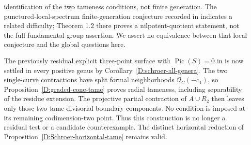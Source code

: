 \begin{remark}
identification of the two tameness conditions, not finite generation.
The punctured-local-spectrum finite-generation conjecture recorded in
\cite[Conjecture 1.1]{Suzuki2023} indicates a related difficulty;
Theorem 1.2 there proves a nilpotent-quotient statement, not the full
fundamental-group assertion. We assert no equivalence between that
local conjecture and the global questions here.
\par
The previously residual explicit three-point surface with
$\operatorname{Pic}(S)=0$ in
\cite[sections 3.1--3.2, author's PDF p.~5]{Schroer1999D}
is now settled in every positive genus by
Corollary~\ref{D:schroer-all-genera}.  The two single-curve
contractions have split formal neighborhoods
$\mathcal O_C(-c_1)$, so Proposition~\ref{D:graded-cone-tame}
proves radial tameness, including separability of the residue
extension.  The projective partial contraction of $A\cup R_2$
then leaves only those two tame divisorial boundary components.
No condition is imposed at its remaining codimension-two point.
Thus this construction is no longer a residual test or a
candidate counterexample.  The distinct horizontal reduction
of Proposition~\ref{D:Schroer-horizontal-tame} remains valid.


\end{remark}
